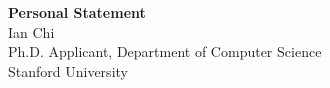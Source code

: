 \documentclass[11pt]{article}
\begin{document}
\begin{center}
    {\Large \textbf{Personal Statement}}\\[4pt]
    {\large Ian Chi}\\[2pt]
    Ph.D. Applicant, Department of Computer Science\\
    Stanford University
\end{center}

\vspace{1em}

\end{document}
